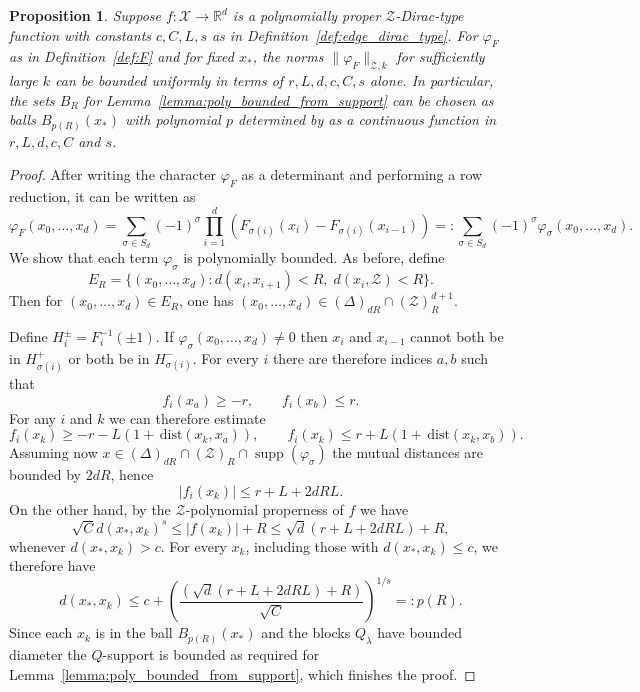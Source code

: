 \documentclass[12pt]{amsart}
\newtheorem{proposition}[theorem]{Proposition}
\newcommand{\RM}{{\mathbb R}}
\newcommand{\Xx}{{\mathcal X}}
\newcommand{\Zz}{{\mathcal Z}}
\DeclareMathOperator{\supp}{supp}
\begin{document}
\begin{proposition}\label{prop:poly_proper_bounded}
Suppose $f:\Xx \to \RM^d$ is a polynomially proper $\Zz$-Dirac-type function with constants $c,C,L, s$ as in Definition~\ref{def:edge_dirac_type}. For $\varphi_F$ as in Definition~\ref{def:F} and for fixed $x_*$, the norms $\|\varphi_F\|_{\Zz,k}$ for sufficiently large $k$ can be bounded uniformly in terms of $r, L,d, c, C, s$ alone. In particular, the sets $B_R$ for Lemma~\ref{lemma:poly_bounded_from_support} can be chosen as balls $B_{p(R)}(x_*)$ with polynomial $p$ determined by as a continuous function in $r,L,d,c,C$ and $s$.
\end{proposition}
\begin{proof}
After writing the character $\varphi_F$ as a determinant and performing a row reduction, it can be written as
$$\varphi_{F}(x_0,\dots,x_d)= \sum_{\sigma\in S_d} (-1)^\sigma \prod_{i=1}^{d} \left(F_{\sigma(i)}(x_i)-F_{\sigma(i)}(x_{i-1})\right)=: \sum_{\sigma\in S_d} (-1)^\sigma \varphi_\sigma(x_0,\ldots,x_d).$$
We show that each term $\varphi_\sigma$ is polynomially bounded. As before, define
$$E_R=\{(x_0,\dots,x_d): d(x_i, x_{i+1})<R, \; d(x_i, \Zz)< R\}.$$
Then for $(x_0,\dots,x_d) \in E_R$, one has $(x_0,\dots,x_d)\in (\Delta)_{dR}\cap (\Zz)_R^{d+1}$.

Define $H_i^\pm = F_i^{-1}(\pm 1)$. If $\varphi_\sigma(x_0,\ldots,x_d)\neq 0$ then $x_i$ and $x_{i-1}$ cannot both be in $H_{\sigma(i)}^+$ or both be in $H_{\sigma(i)}^-$. For every $i$ there are therefore indices $a,b$ such that
$$f_i(x_a) \geq -r, \qquad f_i(x_b) \leq r.$$
For any $i$ and $k$ we can therefore estimate
$$f_i(x_k)\geq -r - L(1+\, \mathrm{dist}(x_k,x_a)), \qquad f_i(x_k)\leq r + L(1+\, \mathrm{dist}(x_k,x_b)).$$
Assuming now $x\in (\Delta)_{dR}\cap (\Zz)_R \cap \supp(\varphi_\sigma)$ the mutual distances are bounded by $2dR$, hence
$$|f_i(x_k)| \leq r + L + 2dRL.$$
On the other hand, by the $\Zz$-polynomial properness of $f$ we have
\[ \sqrt{C} d(x_*,x_k)^s \leq |f(x_k)| + R \leq \sqrt{d}(r+L+2dRL)+R,\]
whenever $d(x_*,x_k) > c$. For every $x_k$, including those with $d(x_*,x_k)\leq c$, we therefore have
$$d(x_*,x_k)\leq c+ \left(\frac{(\sqrt{d}(r+L+2dRL) + R)}{\sqrt{C}}\right)^{1/s} =: p(R).$$
Since each $x_k$ is in the ball $B_{p(R)}(x_*)$ and the blocks $Q_\lambda$ have bounded diameter the $Q$-support is bounded as required for Lemma~\ref{lemma:poly_bounded_from_support}, which finishes the proof.
\end{proof}
\end{document}

